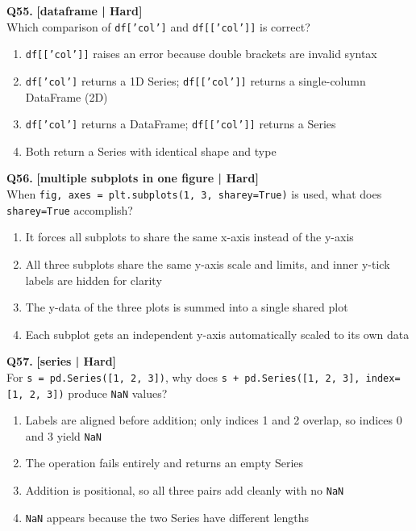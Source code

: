\noindent\textbf{Q55.} \hfill {\small\color{LPUOrange}\textbf{[dataframe | Hard]}}\\[2pt]
Which comparison of \texttt{df['col']} and \texttt{df[['col']]} is correct?

\begin{enumerate}[label=(\alph*),topsep=2pt,itemsep=1pt,partopsep=0pt,parsep=0pt]
    \item \relax \texttt{df[['col']]} raises an error because double brackets are invalid syntax
    \item \relax \texttt{df['col']} returns a 1D Series; \texttt{df[['col']]} returns a single-column DataFrame (2D)
    \item \relax \texttt{df['col']} returns a DataFrame; \texttt{df[['col']]} returns a Series
    \item \relax Both return a Series with identical shape and type
\end{enumerate}
\vspace{2mm}

\noindent\textbf{Q56.} \hfill {\small\color{LPUOrange}\textbf{[multiple subplots in one figure | Hard]}}\\[2pt]
When \texttt{fig, axes = plt.subplots(1, 3, sharey=True)} is used, what does \texttt{sharey=True} accomplish?

\begin{enumerate}[label=(\alph*),topsep=2pt,itemsep=1pt,partopsep=0pt,parsep=0pt]
    \item \relax It forces all subplots to share the same x-axis instead of the y-axis
    \item \relax All three subplots share the same y-axis scale and limits, and inner y-tick labels are hidden for clarity
    \item \relax The y-data of the three plots is summed into a single shared plot
    \item \relax Each subplot gets an independent y-axis automatically scaled to its own data
\end{enumerate}
\vspace{2mm}

\noindent\textbf{Q57.} \hfill {\small\color{LPUOrange}\textbf{[series | Hard]}}\\[2pt]
For \texttt{s = pd.Series([1, 2, 3])}, why does \texttt{s + pd.Series([1, 2, 3], index=[1, 2, 3])} produce \texttt{NaN} values?

\begin{enumerate}[label=(\alph*),topsep=2pt,itemsep=1pt,partopsep=0pt,parsep=0pt]
    \item \relax Labels are aligned before addition; only indices 1 and 2 overlap, so indices 0 and 3 yield \texttt{NaN}
    \item \relax The operation fails entirely and returns an empty Series
    \item \relax Addition is positional, so all three pairs add cleanly with no \texttt{NaN}
    \item \relax \texttt{NaN} appears because the two Series have different lengths
\end{enumerate}
\vspace{2mm}

